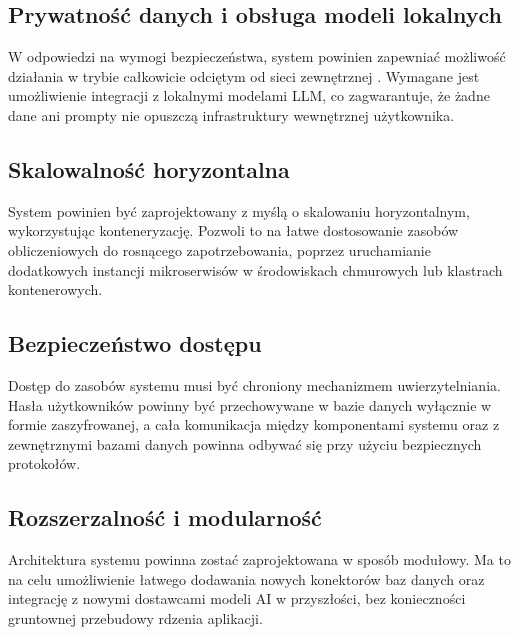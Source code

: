 \subsection*{Prywatność danych i obsługa modeli lokalnych}
W odpowiedzi na wymogi bezpieczeństwa, system powinien zapewniać możliwość działania w trybie całkowicie odciętym od sieci zewnętrznej \cite{air_gap_networking}. Wymagane jest umożliwienie integracji z lokalnymi modelami \gls{LLM}, co zagwarantuje, że żadne dane ani prompty nie opuszczą infrastruktury wewnętrznej użytkownika.

\subsection*{Skalowalność horyzontalna}
System powinien być zaprojektowany z myślą o skalowaniu horyzontalnym, wykorzystując konteneryzację. Pozwoli to na łatwe dostosowanie zasobów obliczeniowych do rosnącego zapotrzebowania, poprzez uruchamianie dodatkowych instancji mikroserwisów w środowiskach chmurowych lub klastrach kontenerowych.

\subsection*{Bezpieczeństwo dostępu}
Dostęp do zasobów systemu musi być chroniony mechanizmem uwierzytelniania. Hasła użytkowników powinny być przechowywane w bazie danych wyłącznie w formie zaszyfrowanej, a cała komunikacja między komponentami systemu oraz z zewnętrznymi bazami danych powinna odbywać się przy użyciu bezpiecznych protokołów.

\subsection*{Rozszerzalność i modularność}
Architektura systemu powinna zostać zaprojektowana w sposób modułowy. Ma to na celu umożliwienie łatwego dodawania nowych konektorów baz danych oraz integrację z nowymi dostawcami modeli AI w przyszłości, bez konieczności gruntownej przebudowy rdzenia aplikacji.